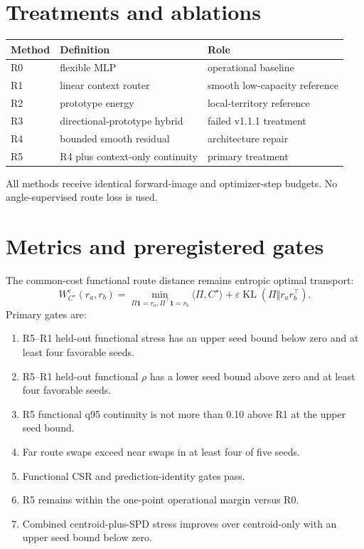 \documentclass[11pt,a4paper]{article}
\begin{document}
\section{Treatments and ablations}
\begin{table}[H]\centering\small\begin{tabularx}{\textwidth}{@{}lXl@{}}\toprule
Method & Definition & Role\\\midrule
R0 & flexible MLP & operational baseline\\
R1 & linear context router & smooth low-capacity reference\\
R2 & prototype energy & local-territory reference\\
R3 & directional-prototype hybrid & failed v1.1.1 treatment\\
R4 & bounded smooth residual & architecture repair\\
R5 & R4 plus context-only continuity & primary treatment\\\bottomrule
\end{tabularx}\end{table}
All methods receive identical forward-image and optimizer-step budgets. No angle-supervised route loss is used.
\section{Metrics and preregistered gates}
The common-cost functional route distance remains entropic optimal transport:
\[
W_{C^\star}^{\varepsilon}(r_a,r_b)=\min_{\Pi\mathbf 1=r_a,\Pi^\top\mathbf 1=r_b}\langle\Pi,C^\star\rangle+\varepsilon\operatorname{KL}(\Pi\Vert r_ar_b^\top).
\]
Primary gates are:
\begin{enumerate}[leftmargin=1.8em]
\item R5--R1 held-out functional stress has an upper seed bound below zero and at least four favorable seeds.
\item R5--R1 held-out functional $\rho$ has a lower seed bound above zero and at least four favorable seeds.
\item R5 functional q95 continuity is not more than 0.10 above R1 at the upper seed bound.
\item Far route swaps exceed near swaps in at least four of five seeds.
\item Functional CSR and prediction-identity gates pass.
\item R5 remains within the one-point operational margin versus R0.
\item Combined centroid-plus-SPD stress improves over centroid-only with an upper seed bound below zero.
\end{enumerate}
\end{document}
